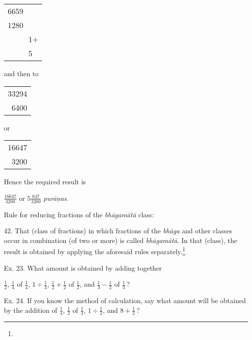 \documentclass[10pt, openany]{book}
\begin{document}
{{{{{{{{{{{{{{{{{{{{\begin{sloppypar}
{\hspace{30mm} \begin{tabular}{l} 6659\\ 1280\\ \,~~~~~1$+$\\ ~\,~~~~5 \end{tabular}
\vspace{3mm}

\noindent and then to
\vspace{1mm}

\hspace{20mm} \begin{tabular}{r}33294\\6400\end{tabular} or 
\begin{tabular}{r}16647\\3200\end{tabular}
\vspace{3mm}

Hence the required result is
\vspace{2mm}

\hspace{10mm} $\frac{16647}{3200}$ or $5 \frac {647}{3200}$ \textit{purāṇas}.}
\vspace{4mm}

\noindent Rule for reducing fractions of the  \textit{bhāgamātā} class:
\vspace{3mm}

 42. That (class of fractions) in which fractions of the \textit{bhāga} and other classes occur in combination (of two or
more) is called  \textit{bhāgamātā}. In that (class), the result is obtained
by applying the aforesaid rules separately.\renewcommand{\thefootnote}{1}\footnote{}
\vspace{3mm}

 Ex. 23. What amount is obtained by adding together
\vspace{2mm}

\hspace{15mm} $\frac{1}{2}$, $\frac{1}{4}$ of $\frac{1}{4}$, $1 \div \frac{1}{3}$, $\frac{1}{2} + \frac{1}{2}$ of $\frac{1}{2}$, and $\frac{1}{3} - \frac{1}{2}$ of $\frac{1}{3}$\,?
\vspace{4mm}

 Ex. 24. If you know the method of calculation, say
what amount will be obtained by the addition of $\frac{1}{4}$, $\frac{1}{2}$ of $\frac{1}{3}$,
$1 \div \frac{1}{2}$, and $8 + \frac{1}{2}$\,?
\vspace{4mm}


\end{sloppypar}}}}}}}}}}}}}}}}}}}}}
\end{document}
